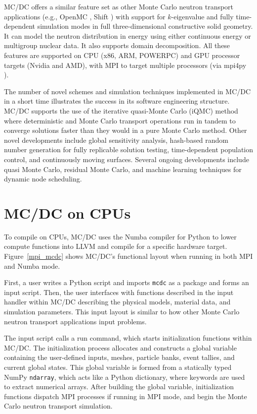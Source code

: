 MC/DC offers a similar feature set as other Monte Carlo neutron transport applications (e.g., OpenMC \cite{romano_openmc_2015}, Shift \cite{hamilton_continuous-energy_2019}) with support for $k$-eigenvalue and fully time-dependent simulation modes in full three-dimensional constructive solid geometry.
It can model the neutron distribution in energy using either continuous energy or multigroup nuclear data.
It also supports domain decomposition.
All these features are supported on CPU (x86, ARM, POWERPC) and GPU processor targets (Nvidia and AMD), with MPI to target multiple processors (via mpi4py \cite{dalcin_mpi4py_2021}).

The number of novel schemes and simulation techniques implemented in MC/DC in a short time illustrates the success in its software engineering structure.
MC/DC supports the use of the iterative quasi-Monte Carlo (iQMC) method where deterministic and Monte Carlo transport operations run in tandem to converge solutions faster than they would in a pure Monte Carlo method. %
Other novel developments include global sensitivity analysis, hash-based random number generation for fully replicable solution testing, time-dependent population control, and continuously moving surfaces.
Several ongoing developments include quasi Monte Carlo, residual Monte Carlo, and machine learning techniques for dynamic node scheduling.

\section{MC/DC on CPUs}

To compile on CPUs, MC/DC uses the Numba compiler for Python to lower compute functions into LLVM and compile for a specific hardware target.
Figure~\ref{mpi_mcdc} shows MC/DC's functional layout when running in both MPI and Numba mode.

First, a user writes a Python script and imports \texttt{mcdc} as a package and forms an input script.
Then, the user interfaces with functions described in the input handler within MC/DC describing the physical models, material data, and simulation parameters.
This input layout is similar to how other Monte Carlo neutron transport applications input problems.

The input script calls a run command, which starts initialization functions within MC/DC. 
The initialization process allocates and constructs a global variable containing the user-defined inputs, meshes, particle banks, event tallies, and current global states.
This global variable is formed from a statically typed NumPy \texttt{ndarray}, which acts like a Python dictionary, where keywords are used to extract numerical arrays.
After building the global variable, initialization functions dispatch MPI processes if running in MPI mode, and begin the Monte Carlo neutron transport simulation.


